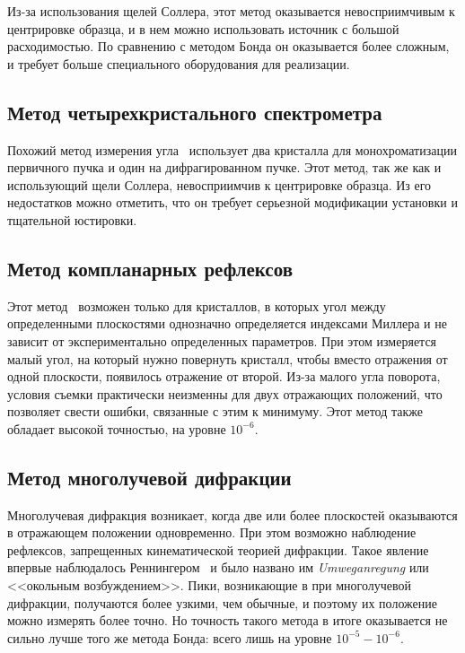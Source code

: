 \documentclass[a4paper,14pt]{extarticle}
\newcounter{x}
\begin{document}
Из-за использования щелей Соллера, этот метод оказывается невосприимчивым к центрировке образца, и в нем можно использовать источник с большой расходимостью.
По сравнению с методом Бонда он оказывается более сложным, и требует больше специального оборудования для реализации.

\subsection{Метод четырехкристального спектрометра}

Похожий метод измерения угла~\cite{Fewster:1989} использует два кристалла для монохроматизации первичного пучка и один на дифрагированном пучке.
Этот метод, так же как и использующий щели Соллера, невосприимчив к центрировке образца.
Из его недостатков можно отметить, что он требует серьезной модификации установки и тщательной юстировки.

\subsection{Метод компланарных рефлексов}

Этот метод~\cite{Isomae:1976} возможен только для кристаллов, в которых угол между определенными плоскостями однозначно определяется индексами Миллера и не зависит от экспериментально определенных параметров.
При этом измеряется малый угол, на который нужно повернуть кристалл, чтобы вместо отражения от одной плоскости, появилось отражение от второй.
Из-за малого угла поворота, условия съемки практически неизменны для двух отражающих положений, что позволяет свести ошибки, связанные с этим к минимуму.
Этот метод также обладает высокой точностью, на уровне $10^{-6}$.

\subsection{Метод многолучевой дифракции}

Многолучевая дифракция возникает, когда две или более плоскостей оказываются в отражающем положении одновременно.
При этом возможно наблюдение рефлексов, запрещенных кинематической теорией дифракции.
Такое явление впервые наблюдалось Реннингером~\cite{Renninger:1937} и было названо им \textit{Umweganregung} или <<окольным возбуждением>>.
Пики, возникающие в при многолучевой дифракции, получаются более узкими, чем обычные, и поэтому их положение можно измерять более точно.
Но точность такого метода в итоге оказывается не сильно лучше того же метода Бонда: всего лишь на уровне $10^{-5} - 10^{-6}$.
\end{document}
